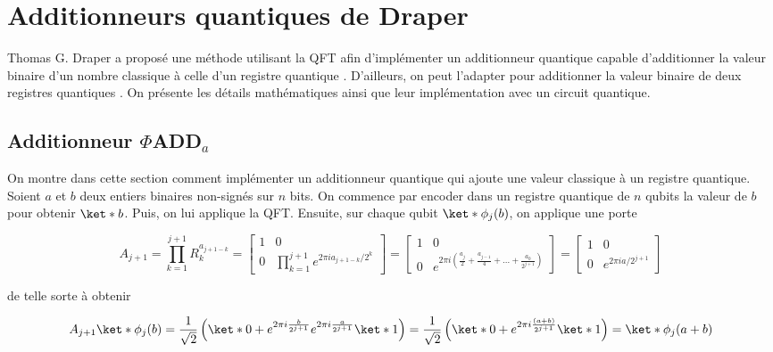 \section{Additionneurs quantiques de Draper}

Thomas G. Draper a proposé une méthode utilisant la QFT afin d'implémenter un additionneur quantique capable d'additionner la valeur binaire d'un nombre classique à celle d'un registre quantique \cite{draper2000additionquantumcomputer}. D'ailleurs, on peut l'adapter pour additionner la valeur binaire de deux registres quantiques \cite{draper2000additionquantumcomputer}. On présente les détails mathématiques ainsi que leur implémentation avec un circuit quantique.

\subsection{Additionneur $\Phi$ADD$_a$}
On montre dans cette section comment implémenter un additionneur quantique qui ajoute une valeur classique à un registre quantique. Soient $a$ et $b$ deux entiers binaires non-signés sur $n$ bits. On commence par encoder dans un registre quantique de $n$ qubits la valeur de $b$ pour obtenir $\ket*{b}$. Puis, on lui applique la QFT. Ensuite, sur chaque qubit $\ket*{\phi_j(b)}$, on applique une porte

\begin{equation}
    A_{j+1} = \prod_{k=1}^{j+1} R_k^{a_{j + 1 -k}} = \begin{bmatrix}
        1 & 0 \\
        0 & \prod_{k=1}^{j+1}e^{2\pi i a_{j+1-k}/2^k}
    \end{bmatrix} = 
    \begin{bmatrix}
        1 & 0 \\
        0 & e^{2\pi i \left(\frac{a_j}{2} + \frac{a_{j-1}}{4} + ... + \frac{a_0}{2^{j+1}}\right)}
    \end{bmatrix} =
    \begin{bmatrix}
        1 & 0 \\
        0 & e^{2\pi i a /2^{j+1}}
    \end{bmatrix}
\end{equation}

de telle sorte à obtenir 

\begin{equation*}
    A_{j+1}\ket*{\phi_j(b)}  = \frac{1}{\sqrt{2}} \left(\ket*{0} + e^{2\pi i \frac{b}{2^{j+1}}} e^{2\pi i \frac{a}{2^{j+1}}} \ket*{1}\right) = \frac{1}{\sqrt{2}} \left(\ket*{0} + e^{2\pi i \frac{(a+b)}{2^{j+1}}} \ket*{1}\right) = \ket*{\phi_j(a+b)}
\end{equation*}

